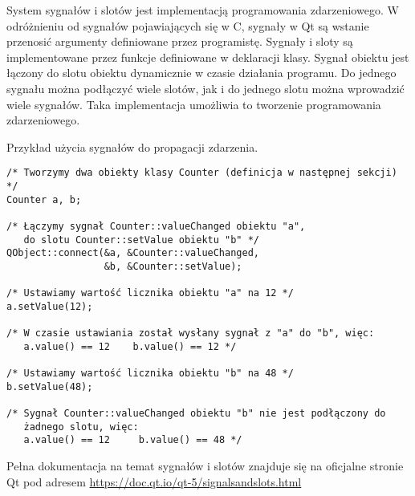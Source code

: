 
\par
System sygnałów i slotów jest implementacją programowania zdarzeniowego.
W odróżnieniu od sygnałów pojawiających się w C, sygnały w Qt są wstanie przenosić argumenty definiowane przez programistę.
Sygnały i sloty są implementowane przez funkcje definiowane w deklaracji klasy.
Sygnał obiektu jest łączony do slotu obiektu dynamicznie w czasie działania programu.
Do jednego sygnału można podłączyć wiele slotów, jak i do jednego slotu można wprowadzić wiele sygnałów.
Taka implementacja umożliwia to tworzenie programowania zdarzeniowego.

\par
Przykład użycia sygnałów do propagacji zdarzenia.

\begin{lstlisting}
/* Tworzymy dwa obiekty klasy Counter (definicja w następnej sekcji) */
Counter a, b;

/* Łączymy sygnał Counter::valueChanged obiektu "a",
   do slotu Counter::setValue obiektu "b" */
QObject::connect(&a, &Counter::valueChanged,
                 &b, &Counter::setValue);

/* Ustawiamy wartość licznika obiektu "a" na 12 */
a.setValue(12);

/* W czasie ustawiania został wysłany sygnał z "a" do "b", więc:
   a.value() == 12    b.value() == 12 */

/* Ustawiamy wartość licznika obiektu "b" na 48 */
b.setValue(48);

/* Sygnał Counter::valueChanged obiektu "b" nie jest podłączony do
   żadnego slotu, więc:
   a.value() == 12     b.value() == 48 */

\end{lstlisting}

\par
Pełna dokumentacja na temat sygnałów i slotów znajduje się na oficjalne stronie Qt pod adresem \url{https://doc.qt.io/qt-5/signalsandslots.html}